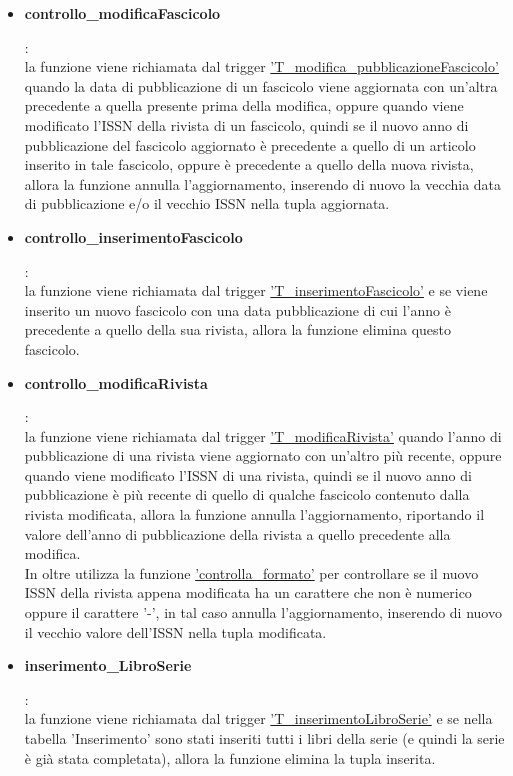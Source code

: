 \documentclass{article}
\begin{document}
\begin{itemize}
    \item \hypertarget{f6}{\textbf{controllo\_modificaFascicolo}}:\\
    la funzione viene richiamata dal trigger \hyperlink{t6}{'T\_modifica\_pubblicazioneFascicolo'} quando la data di pubblicazione di un fascicolo viene aggiornata con un'altra precedente a quella presente prima della modifica, oppure quando viene modificato l'ISSN della rivista di un fascicolo, quindi se il nuovo anno di pubblicazione del fascicolo aggiornato è precedente a quello di un articolo inserito in tale fascicolo, oppure è precedente a quello della nuova rivista, allora la funzione annulla l'aggiornamento, inserendo di nuovo la vecchia data di pubblicazione e/o il vecchio ISSN nella tupla aggiornata.

    \item \hypertarget{f7}{\textbf{controllo\_inserimentoFascicolo}}:\\
    la funzione viene richiamata dal trigger \hyperlink{t7}{'T\_inserimentoFascicolo'} e se viene inserito un nuovo fascicolo con una data pubblicazione di cui l'anno è precedente a quello della sua rivista, allora la funzione elimina questo fascicolo.

    \item \hypertarget{f9}{\textbf{controllo\_modificaRivista}}:\\
    la funzione viene richiamata dal trigger \hyperlink{t9}{'T\_modificaRivista'} quando l'anno di pubblicazione di una rivista viene aggiornato con un'altro più recente, oppure quando viene modificato l'ISSN di una rivista, quindi se il nuovo anno di pubblicazione è più recente di quello di qualche fascicolo contenuto dalla rivista modificata, allora la funzione annulla l'aggiornamento, riportando il valore dell'anno di pubblicazione della rivista a quello precedente alla modifica.\\
    In oltre utilizza la funzione \hyperlink{f24}{'controlla\_formato'} per controllare se il nuovo ISSN della rivista appena modificata ha un carattere che non è numerico oppure il carattere '-', in tal caso annulla l'aggiornamento, inserendo di nuovo il vecchio valore dell'ISSN nella tupla modificata. 

    \item \hypertarget{f10}{\textbf{inserimento\_LibroSerie}}:\\
    la funzione viene richiamata dal trigger \hyperlink{t10}{'T\_inserimentoLibroSerie'} e se nella tabella 'Inserimento' sono stati inseriti tutti i libri della serie (e quindi la serie è già stata completata), allora la funzione elimina la tupla inserita.


\end{itemize}
\end{document}
